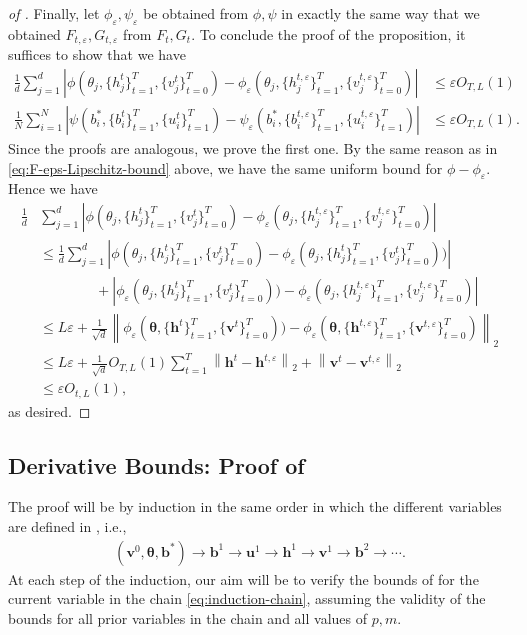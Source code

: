 \documentclass{article}
\newcommand{\1}{\mathbbm{1}}
\newcommand{\norm}[1]{\left\lVert#1\right\rVert}
\theoremstyle{plain}
\theoremstyle{definition}
\theoremstyle{remark}
\newcommand{\eps}{\varepsilon}
\newcommand{\bfu}{\boldsymbol{u}}
\newcommand{\bfv}{\boldsymbol{v}}
\newcommand{\bfh}{\boldsymbol{h}}
\newcommand{\bfb}{\boldsymbol{b}}
\newcommand{\bftheta}{\boldsymbol{\theta}}
\begin{document}
\begin{proof}[of ]
Finally, let $\phi_{\eps},\psi_\eps$ be obtained from $\phi,\psi$ in exactly the same way that we obtained $F_{t,\eps},G_{t,\eps}$ from $F_t,G_t.$ To conclude the proof of the proposition, it suffices to show that we have 
\begin{align*}
    \frac{1}{d}\sum_{j=1}^d |\phi(\theta_j, \{h_j^t\}_{t=1}^T, \{v_j^t\}_{t=0}^T) - \phi_\eps(\theta_j, \{h_j^{t,\eps}\}_{t=1}^T, \{v_j^{t,\eps}\}_{t=0}^T)| &\leq \eps O_{T,L}(1) \\
    \frac{1}{N}\sum_{i=1}^N |\psi(b_i^*, \{b_i^t\}_{t=1}^T, \{u_i^t\}_{t=1}^T) - \psi_\eps(b_i^*, \{b_i^{t,\eps}\}_{t=1}^T, \{u_i^{t,\eps}\}_{t=1}^T)| &\leq \eps O_{T,L}(1).
\end{align*}
Since the proofs are analogous, we prove the first one. By the same reason as in \eqref{eq:F-eps-Lipschitz-bound} above, we have the same uniform bound for $\phi - \phi_\eps.$ Hence we have 
\begin{align*}
    \frac{1}{d}&\sum_{j=1}^d |\phi(\theta_j, \{h_j^t\}_{t=1}^T, \{v_j^t\}_{t=0}^T) - \phi_\eps(\theta_j, \{h_j^{t,\eps}\}_{t=1}^T, \{v_j^{t,\eps}\}_{t=0}^T)| \\
    &\leq \frac{1}{d}\sum_{j=1}^d |\phi(\theta_j, \{h_j^t\}_{t=1}^T, \{v_j^t\}_{t=0}^T) - \phi_\eps(\theta_j, \{h_j^t\}_{t=1}^T, \{v_j^t\}_{t=0}^T))| \\
    &\qquad \qquad + |\phi_\eps(\theta_j, \{h_j^t\}_{t=1}^T, \{v_j^t\}_{t=0}^T)) - \phi_\eps(\theta_j, \{h_j^{t,\eps}\}_{t=1}^T, \{v_j^{t,\eps}\}_{t=0}^T)| \\
    &\leq L\eps + \frac{1}{\sqrt{d}}\norm{\phi_\eps(\bftheta, \{\bfh^t\}_{t=1}^T, \{\bfv^t\}_{t=0}^T)) - \phi_\eps(\bftheta, \{\bfh^{t,\eps}\}_{t=1}^T, \{\bfv^{t,\eps}\}_{t=0}^T)}_2 \\
    &\leq L\eps + \frac{1}{\sqrt{d}}O_{T,L}(1)\sum_{t=1}^T \norm{\bfh^t - \bfh^{t,\eps}}_2 + \norm{\bfv^t - \bfv^{t,\eps}}_2 \\
    &\leq \eps O_{t,L}(1),
\end{align*}
as desired.
\end{proof}


\subsection{Derivative Bounds: Proof of }\label{sec:proof-of-derivative-bounds}


The proof will be by induction in the same order in which the different variables are defined in , i.e., 
\begin{align}
    (\bfv^0,\bftheta,\bfb^*)\to \bfb^1\to \bfu^1\to \bfh^1 \to \bfv^1\to \bfb^2\to \cdots. \label{eq:induction-chain}
\end{align}
At each step of the induction, our aim will be to verify the bounds of  for the current variable in the chain \eqref{eq:induction-chain}, assuming the validity of the bounds for all prior variables in the chain and all values of $p,m.$ 
\end{document}
